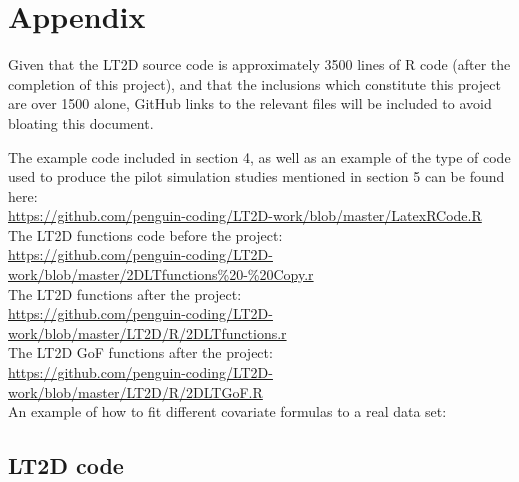 \documentclass[11pt]{article}
\begin{document}
\section{Appendix}

Given that the LT2D source code is approximately 3500 lines of R code (after the completion of this project), and that the inclusions which constitute this project are over 1500 alone, GitHub links to the relevant files will be included to avoid bloating this document.


The example code included in section 4, as well as an example of the type of code used to produce the pilot simulation studies mentioned in section 5 can be found here: 
\\
\url{https://github.com/penguin-coding/LT2D-work/blob/master/LatexRCode.R}\\

The LT2D functions code before the project:
\\\url{https://github.com/penguin-coding/LT2D-work/blob/master/2DLTfunctions\%20-\%20Copy.r}\\

The LT2D functions after the project:\\\url{
https://github.com/penguin-coding/LT2D-work/blob/master/LT2D/R/2DLTfunctions.r}\\

The LT2D GoF functions after the project:\\
\url{https://github.com/penguin-coding/LT2D-work/blob/master/LT2D/R/2DLTGoF.R}\\

An example of how to fit different covariate formulas to a real data set:\\


\subsection{LT2D code}
\end{document}
